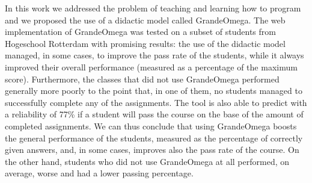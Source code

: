 In this work we addressed the problem of teaching and learning how to program and we proposed the use of a didactic model called GrandeOmega. The web implementation of GrandeOmega was tested on a subset of students from Hogeschool Rotterdam with promising results: the use of the didactic model managed, in some cases, to improve the pass rate of the students, while it always improved their overall performance (measured as a percentage of the maximum score). Furthermore, the classes that did not use GrandeOmega performed generally more poorly to the point that, in one of them, no students managed to successfully complete any of the assignments. The tool is also able to predict with a reliability of 77\% if a student will pass the course on the base of the amount of completed assignments. We can thus conclude that using GrandeOmega boosts the general performance of the students, measured as the percentage of correctly given answers, and, in some cases, improves also the pass rate of the course. On the other hand, students who did not use GrandeOmega at all performed, on average, worse and had a lower passing percentage.